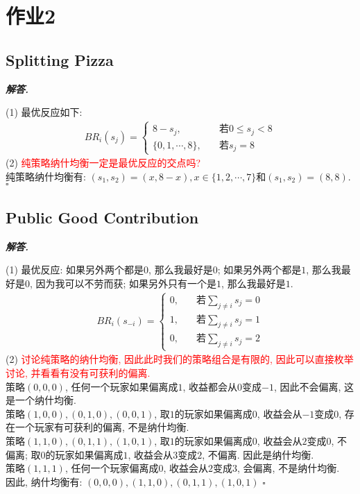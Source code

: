 \documentclass[10pt, a4paper, oneside]{ctexart}
\newenvironment{solution}{%
  \par\noindent\textbf{\textit{解答. }}\ignorespaces
}{%
  \hfill\ensuremath{\square}\par %
}
\begin{document}
\section{作业2}
\subsection{Splitting Pizza}
\begin{solution}
(1) 最优反应如下:
\begin{align*}
    BR_i(s_j)=\begin{cases}
        8-s_j, &\quad \text{若} 0\leq s_j<8\\
        \{0,1,\cdots,8\}, &\quad \text{若} s_j=8
    \end{cases}
\end{align*}
(2) \textcolor{red}{纯策略纳什均衡一定是最优反应的交点吗?}\\
纯策略纳什均衡有: $(s_1,s_2)=(x,8-x), x\in \{1,2,\cdots,7\}$和$(s_1,s_2)=(8,8)$.
\end{solution}

\subsection{Public Good Contribution}
\begin{solution}
(1) 最优反应: 如果另外两个都是$0$, 那么我最好是$0$; 如果另外两个都是$1$, 那么我最好是$0$, 因为我可以不劳而获; 如果另外只有一个是$1$, 那么我最好是$1$.
\begin{align*}
    BR_i(s_{-i})=\begin{cases}
        0,&\quad \text{若}\sum_{j\neq i}s_j=0\\
        1,&\quad \text{若}\sum_{j\neq i}s_j=1\\
        0,&\quad \text{若}\sum_{j\neq i}s_j=2
    \end{cases}
\end{align*}
(2) \textcolor{red}{讨论纯策略的纳什均衡, 因此此时我们的策略组合是有限的, 因此可以直接枚举讨论, 并看看有没有可获利的偏离.}\\
策略$(0,0,0)$, 任何一个玩家如果偏离成$1$, 收益都会从$0$变成$-1$, 因此不会偏离, 这是一个纳什均衡.\\
策略$(1,0,0),(0,1,0),(0,0,1)$, 取$1$的玩家如果偏离成$0$, 收益会从$-1$变成$0$, 存在一个玩家有可获利的偏离, 不是纳什均衡.\\
策略$(1,1,0),(0,1,1),(1,0,1)$, 取$1$的玩家如果偏离成$0$, 收益会从$2$变成$0$, 不偏离; 取$0$的玩家如果偏离成$1$, 收益会从$3$变成$2$, 不偏离. 因此是纳什均衡.\\
策略$(1,1,1)$, 任何一个玩家偏离成$0$, 收益会从$2$变成$3$, 会偏离, 不是纳什均衡.\\
因此, 纳什均衡有: $(0,0,0),(1,1,0),(0,1,1),(1,0,1)$
\end{solution}
\end{document}
